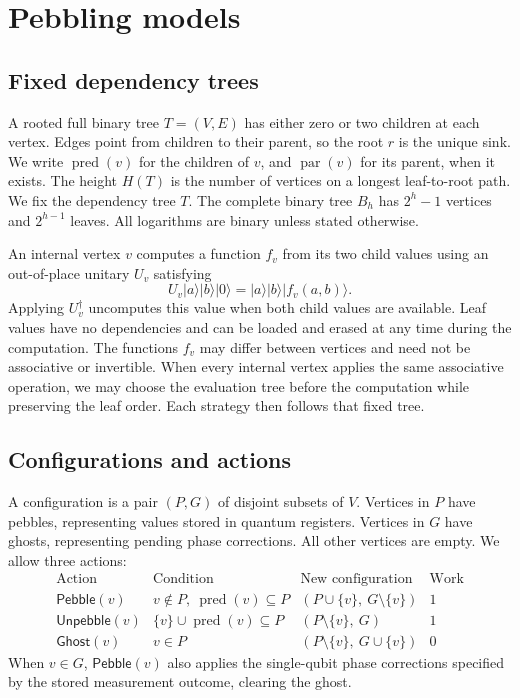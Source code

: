 \documentclass[11pt]{article}
\theoremstyle{definition}
\theoremstyle{remark}
\DeclareMathOperator{\pred}{pred}
\DeclareMathOperator{\parv}{par}
\newcommand{\Peb}{\mathsf{Pebble}}
\newcommand{\ket}[1]{\lvert#1\rangle}
\newcommand{\Unp}{\mathsf{Unpebble}}
\newcommand{\Ghost}{\mathsf{Ghost}}
\begin{document}
\section{Pebbling models}
\label{sec:models}

\subsection{Fixed dependency trees}

A rooted full binary tree $T=(V,E)$ has either zero or two children at each vertex. Edges point from children to their parent, so the root $r$ is the unique sink. We write $\pred(v)$ for the children of $v$, and $\parv(v)$ for its parent, when it exists. The height $H(T)$ is the number of vertices on a longest leaf-to-root path. We fix the dependency tree $T$. The complete binary tree $B_h$ has
$2^h-1$ vertices and $2^{h-1}$ leaves.
All logarithms are binary unless stated otherwise.

An internal vertex $v$ computes a function $f_v$ from its two child values using an out-of-place unitary $U_v$ satisfying
\[
U_v\ket{a}\ket{b}\ket{0}=\ket{a}\ket{b}\ket{f_v(a,b)}.
\]
Applying $U_v^\dagger$ uncomputes this value when both child values are available. Leaf values have no dependencies and can be loaded and erased at any time during the computation. The functions $f_v$ may differ between vertices and need not be associative or invertible.
When every internal vertex applies the same associative operation,
we may choose the evaluation tree before the computation while
preserving the leaf order. Each strategy then follows that fixed tree.

\subsection{Configurations and actions}

A configuration is a pair $(P,G)$ of disjoint subsets of $V$. Vertices in $P$ have pebbles, representing values stored in quantum registers. Vertices in $G$ have ghosts, representing pending phase corrections. All other vertices are empty. We allow three actions:
\[
\begin{array}{lllc}
\text{Action} & \text{Condition} & \text{New configuration} & \text{Work} \\[3pt]
\Peb(v) & v\notin P,\ \pred(v)\subseteq P & (P\cup\{v\},\ G\setminus\{v\}) & 1 \\[3pt]
\Unp(v) & \{v\}\cup\pred(v)\subseteq P & (P\setminus\{v\},\ G) & 1 \\[3pt]
\Ghost(v) & v\in P & (P\setminus\{v\},\ G\cup\{v\}) & 0
\end{array}
\]
When $v\in G$, $\Peb(v)$ also applies the single-qubit phase corrections specified by the stored measurement outcome, clearing the ghost.
\end{document}
